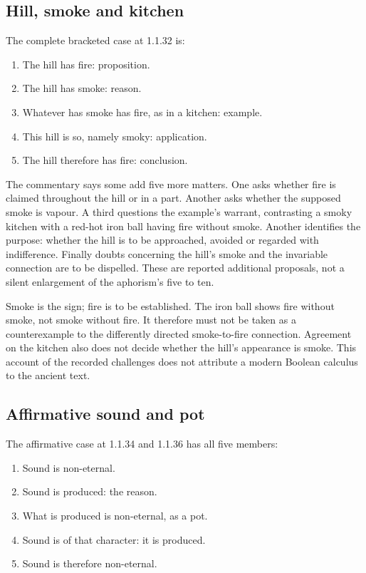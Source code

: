 \subsection{Hill, smoke and kitchen}

The complete bracketed case at 1.1.32 is:

\begin{enumerate}
 \item The hill has fire: proposition.
 \item The hill has smoke: reason.
 \item Whatever has smoke has fire, as in a kitchen: example.
 \item This hill is so, namely smoky: application.
 \item The hill therefore has fire: conclusion.
\end{enumerate}

The commentary says some add five more matters. One asks whether fire is
claimed throughout the hill or in a part. Another asks whether the supposed
smoke is vapour. A third questions the example's warrant, contrasting a
smoky kitchen with a red-hot iron ball having fire without smoke.
Another identifies the purpose: whether the hill is to be approached,
avoided or regarded with indifference. Finally doubts concerning the hill's
smoke and the invariable connection are to be dispelled. These are reported
additional proposals, not a silent enlargement of the aphorism's five to ten.

Smoke is the sign; fire is to be established. The iron ball shows fire
without smoke, not smoke without fire. It therefore must not be taken
as a counterexample to the differently directed smoke-to-fire connection.
Agreement on the kitchen also does not decide whether the hill's appearance
is smoke. This account of the recorded challenges does not attribute a
modern Boolean calculus to the ancient text.

\subsection{Affirmative sound and pot}

The affirmative case at 1.1.34 and 1.1.36 has all five members:

\begin{enumerate}
 \item Sound is non-eternal.
 \item Sound is produced: the reason.
 \item What is produced is non-eternal, as a pot.
 \item Sound is of that character: it is produced.
 \item Sound is therefore non-eternal.
\end{enumerate}

